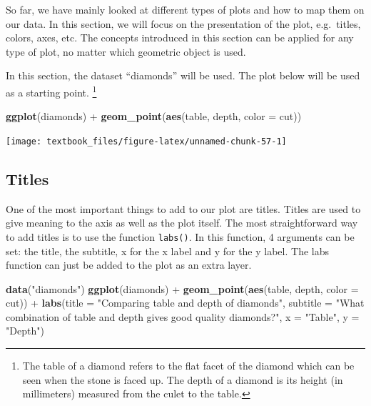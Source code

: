 \documentclass[]{tufte-book}
\newenvironment{Shaded}{}{}
\newcommand{\DataTypeTok}[1]{\textcolor[rgb]{0.56,0.13,0.00}{#1}}
\newcommand{\KeywordTok}[1]{\textcolor[rgb]{0.00,0.44,0.13}{\textbf{#1}}}
\newcommand{\NormalTok}[1]{#1}
\newcommand{\OperatorTok}[1]{\textcolor[rgb]{0.40,0.40,0.40}{#1}}
\newcommand{\StringTok}[1]{\textcolor[rgb]{0.25,0.44,0.63}{#1}}
\begin{document}
So far, we have mainly looked at different types of plots and how to map them on our data. In this section, we will focus on the presentation of the plot, e.g.~titles, colors, axes, etc. The concepts introduced in this section can be applied for any type of plot, no matter which geometric object is used.

In this section, the dataset ``diamonds'' will be used. The plot below will be used as a starting point. \footnote{The table of a diamond refers to the flat facet of the diamond which can be seen when the stone is faced up. The depth of a diamond is its height (in millimeters) measured from the culet to the table.}

\begin{Shaded}
\begin{Highlighting}[]
\KeywordTok{ggplot}\NormalTok{(diamonds) }\OperatorTok{+}
\StringTok{    }\KeywordTok{geom_point}\NormalTok{(}\KeywordTok{aes}\NormalTok{(table, depth, }\DataTypeTok{color =}\NormalTok{ cut))}
\end{Highlighting}
\end{Shaded}

\texttt{[image: textbook\_files/figure-latex/unnamed-chunk-57-1]}

\hypertarget{titles}{%
\subsection{Titles}\label{titles}}

One of the most important things to add to our plot are titles. Titles are used to give meaning to the axis as well as the plot itself. The most straightforward way to add titles is to use the function \texttt{labs()}. In this function, 4 arguments can be set: the title, the subtitle, x for the x label and y for the y label. The labs function can just be added to the plot as an extra layer.

\begin{Shaded}
\begin{Highlighting}[]
\KeywordTok{data}\NormalTok{(}\StringTok{"diamonds"}\NormalTok{)}
\KeywordTok{ggplot}\NormalTok{(diamonds) }\OperatorTok{+}
\StringTok{    }\KeywordTok{geom_point}\NormalTok{(}\KeywordTok{aes}\NormalTok{(table, depth, }\DataTypeTok{color =}\NormalTok{ cut)) }\OperatorTok{+}\StringTok{ }
\StringTok{    }\KeywordTok{labs}\NormalTok{(}\DataTypeTok{title =} \StringTok{"Comparing table and depth of diamonds"}\NormalTok{,}
         \DataTypeTok{subtitle =} \StringTok{"What combination of table and depth gives good quality diamonds?"}\NormalTok{,}
         \DataTypeTok{x =} \StringTok{"Table"}\NormalTok{,}
         \DataTypeTok{y =} \StringTok{"Depth"}\NormalTok{)}
\end{Highlighting}
\end{Shaded}
\end{document}
